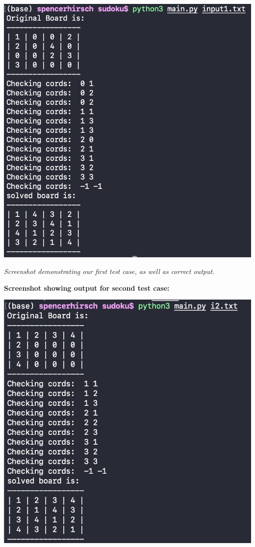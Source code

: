 \documentclass{article}
\begin{document}
\includegraphics{test1.png}

\textit{Screenshot demonstrating our first test case, as well as correct output.}

\pagebreak

\textbf{Screenshot showing output for second test case:}

\bigskip

\includegraphics{test2.png}
\end{document}
